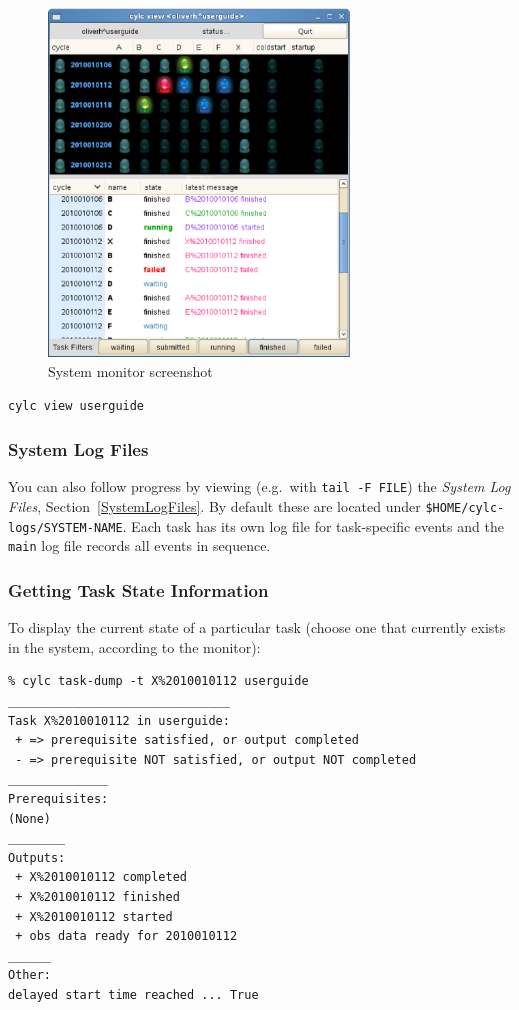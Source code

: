 \documentclass[11pt,a4paper]{article}
\begin{document}
\begin{figure}
    \begin{center}
        \includegraphics[width=8cm]{monitor} 
    \end{center}
    \caption{\small System monitor screenshot}
    \label{fig-monitor} 
\end{figure} 

\begin{lstlisting}
cylc view userguide
\end{lstlisting}

\subsubsection{System Log Files}
\label{QuickSystemLogFiles}

You can also follow progress by viewing (e.g.\ with 
\lstinline=tail -F FILE=) the {\em System Log Files},
Section~\ref{SystemLogFiles}. By
default these are located under \lstinline=$HOME/cylc-logs/SYSTEM-NAME=.
Each task has its own log file for task-specific events and the
\lstinline=main= log file records all events in sequence.


\pagebreak
\lstset{language=}
\subsubsection{Getting Task State Information}
\label{QuickGettingTaskStateInformation}

To display the current state of a particular task (choose one that
currently exists in the system, according to the monitor):

\begin{lstlisting}
% cylc task-dump -t X%2010010112 userguide
_______________________________
Task X%2010010112 in userguide:
 + => prerequisite satisfied, or output completed
 - => prerequisite NOT satisfied, or output NOT completed
______________
Prerequisites:
(None)
________
Outputs:
 + X%2010010112 completed
 + X%2010010112 finished
 + X%2010010112 started
 + obs data ready for 2010010112
______
Other:
delayed start time reached ... True
\end{lstlisting}
\end{document}
